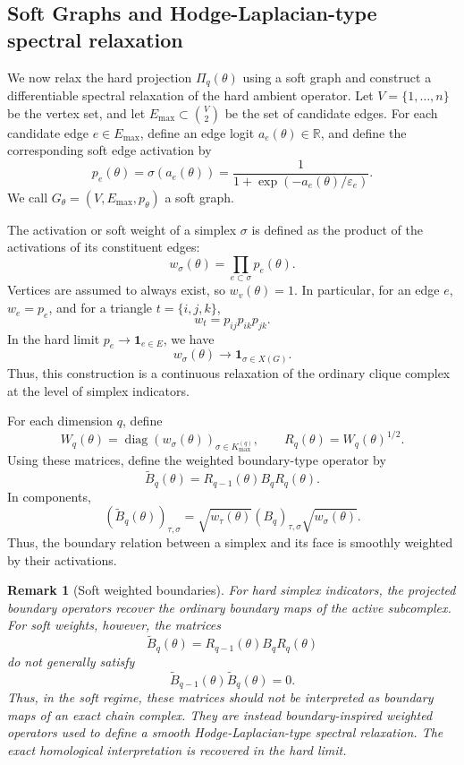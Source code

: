 \documentclass[pdflatex,sn-mathphys-ay]{sn-jnl}%
\theoremstyle{thmstyleone}%
\theoremstyle{thmstyletwo}%
\newtheorem{remark}{Remark}%
\theoremstyle{thmstylethree}%
\begin{document}
\subsection{Soft Graphs and Hodge-Laplacian-type spectral relaxation}

We now relax the hard projection \(\Pi_q(\theta)\) using a soft graph and construct a differentiable spectral relaxation of the hard ambient operator. Let \(V=\{1,\ldots,n\}\) be the vertex set, and let \(E_{\max}\subset \binom{V}{2}\) be the set of candidate edges. For each candidate edge \(e\in E_{\max}\), define an edge logit \(a_e(\theta)\in\mathbb{R}\), and define the corresponding soft edge activation by
\[
p_e(\theta)
=
\sigma(a_e(\theta))
=
\frac{1}{1+\exp(-a_e(\theta)/\varepsilon_e)}.
\]
We call \(G_\theta=(V,E_{\max},p_\theta)\) a soft graph.

The activation or soft weight of a simplex \(\sigma\) is defined as the product of the activations of its constituent edges:
\[
w_\sigma(\theta)
=
\prod_{e\subset\sigma}p_e(\theta).
\]
Vertices are assumed to always exist, so \(w_v(\theta)=1\). In particular, for an edge \(e\), \(w_e=p_e\), and for a triangle \(t=\{i,j,k\}\),
\[
w_t=p_{ij}p_{ik}p_{jk}.
\]
In the hard limit \(p_e\to \mathbf{1}_{e\in E}\), we have
\[
w_\sigma(\theta)\to \mathbf{1}_{\sigma\in X(G)}.
\]
Thus, this construction is a continuous relaxation of the ordinary clique complex at the level of simplex indicators.

For each dimension \(q\), define
\[
W_q(\theta)
=
\operatorname{diag}
\left(
w_\sigma(\theta)
\right)_{\sigma\in K_{\max}^{(q)}},
\qquad
R_q(\theta)=W_q(\theta)^{1/2}.
\]
Using these matrices, define the weighted boundary-type operator by
\[
\widetilde{B}_q(\theta)
=
R_{q-1}(\theta)B_qR_q(\theta).
\]
In components,
\[
\left(
\widetilde{B}_q(\theta)
\right)_{\tau,\sigma}
=
\sqrt{w_\tau(\theta)}
(B_q)_{\tau,\sigma}
\sqrt{w_\sigma(\theta)}.
\]
Thus, the boundary relation between a simplex and its face is smoothly weighted by their activations.


\begin{remark}[Soft weighted boundaries]
For hard simplex indicators, the projected boundary operators recover the ordinary boundary maps of the active subcomplex. For soft weights, however, the matrices
\[
\widetilde{B}_q(\theta)
=
R_{q-1}(\theta)B_qR_q(\theta)
\]
do not generally satisfy
\[
\widetilde{B}_{q-1}(\theta)\widetilde{B}_q(\theta)=0.
\]
Thus, in the soft regime, these matrices should not be interpreted as boundary maps of an exact chain complex. They are instead boundary-inspired weighted operators used to define a smooth Hodge-Laplacian-type spectral relaxation. The exact homological interpretation is recovered in the hard limit.
\end{remark}
\end{document}
